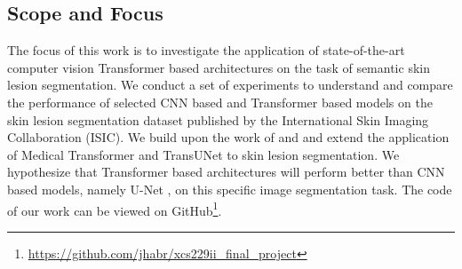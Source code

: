 \subsection{Scope and Focus}

The focus of this work is to investigate the application of state-of-the-art computer vision Transformer based architectures on the task of semantic skin lesion segmentation. We conduct a set of experiments to understand and compare the performance of selected CNN based and Transformer based models on the skin lesion segmentation dataset published by the International Skin Imaging Collaboration (ISIC). We build upon the work of \citep{medical_transformer-2021-valanarasu} and \citep{transunet-2021-chen} and extend the application of Medical Transformer and TransUNet to skin lesion segmentation.  We hypothesize that Transformer based architectures will perform better than CNN based models, namely U-Net \citep{unet-2015-ronneberger}, on this specific image segmentation task. The code of our work can be viewed on GitHub\footnote{\url{https://github.com/jhabr/xcs229ii_final_project}}.





